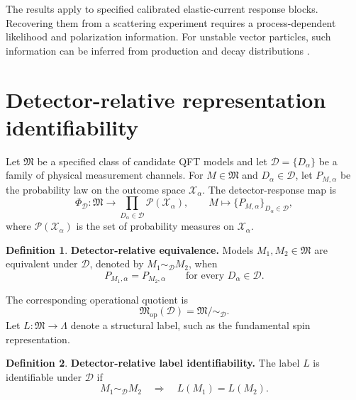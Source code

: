 \documentclass[12pt]{iopjournal}
\newcommand{\Mcal}{\mathfrak M}
\newcommand{\Dcal}{\mathcal D}
\newcommand{\Pcal}{\mathcal P}
\theoremstyle{definition}
\newtheorem{definition}{Definition}[section]
\theoremstyle{remark}
\begin{document}
The results apply to specified calibrated elastic-current response blocks. Recovering them from a scattering experiment requires a process-dependent likelihood and polarization information. For unstable vector particles, such information can be inferred from production and decay distributions \cite{BurnsKongMatchevPark2008,GaoEtAl2010,BolognesiEtAl2012,ChoiChristensenSalmonWang2015}.

\section{Detector-relative representation identifiability}
\label{sec:operational}

Let $\Mcal$ be a specified class of candidate QFT models and let $\Dcal=\{D_\alpha\}$ be a family of physical measurement channels. For $M\in\Mcal$ and $D_\alpha\in\Dcal$, let $P_{M,\alpha}$ be the probability law on the outcome space $\mathcal X_\alpha$. The detector-response map is
\begin{equation}
\Phi_{\Dcal}:\Mcal\rightarrow
\prod_{D_\alpha\in\Dcal}\Pcal(\mathcal X_\alpha),
\qquad
M\mapsto\{P_{M,\alpha}\}_{D_\alpha\in\Dcal},
\label{eq:response-map}
\end{equation}
where $\Pcal(\mathcal X_\alpha)$ is the set of probability measures on $\mathcal X_\alpha$.

\begin{definition}
\textbf{Detector-relative equivalence.}
Models $M_1,M_2\in\Mcal$ are equivalent under $\Dcal$, denoted by $M_1\sim_{\Dcal}M_2$, when
\begin{equation}
P_{M_1,\alpha}=P_{M_2,\alpha}
\qquad\text{for every }D_\alpha\in\Dcal.
\end{equation}
\end{definition}

The corresponding operational quotient is
\begin{equation}
\Mcal_{\mathrm{op}}(\Dcal)=\Mcal/\!\sim_{\Dcal}.
\end{equation}
Let $L:\Mcal\rightarrow\Lambda$ denote a structural label, such as the fundamental spin representation.

\begin{definition}
\textbf{Detector-relative label identifiability.}
The label $L$ is identifiable under $\Dcal$ if
\begin{equation}
M_1\sim_{\Dcal}M_2
\quad\Longrightarrow\quad
L(M_1)=L(M_2).
\end{equation}
\end{definition}
\end{document}
